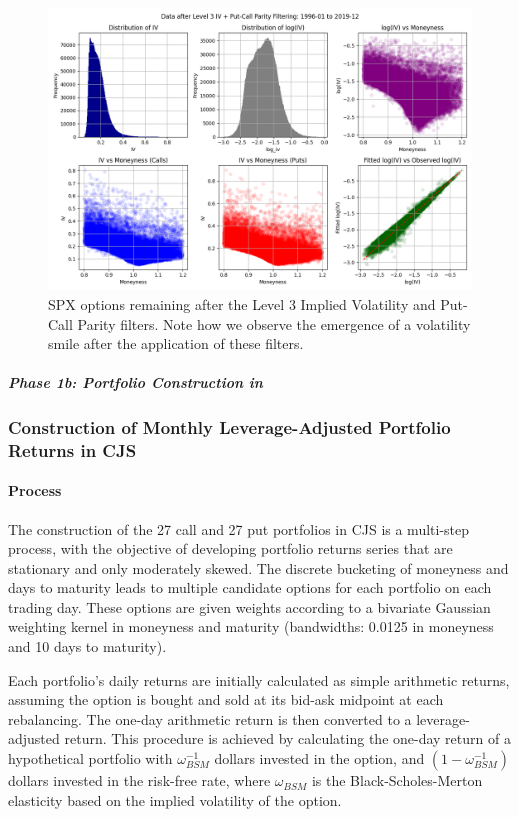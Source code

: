 \documentclass{article}
\begin{document}
\begin{appendices}
\begin{figure}[H]
  \centering
  \includegraphics[width=\linewidth,height=0.666\linewidth]{../docs_src/L3_IV_PCP_1996-01_2019-12_iv.png}
  \caption{SPX options remaining after the Level 3 Implied Volatility and Put-Call Parity filters. Note how we observe the emergence of a volatility smile after the application of these filters.}
  \label{fig:l3_iv_pcp_spx_options_data}
\end{figure}


\paragraph{\textit{Phase 1b: Portfolio Construction in \citet{Constantinides2013}}}
\subsubsection*{Construction of Monthly Leverage-Adjusted Portfolio Returns in CJS}

\paragraph{Process}
The construction of the 27 call and 27 put portfolios in CJS is a multi-step process, with the objective of developing portfolio returns series that are stationary and only moderately skewed. The discrete bucketing of moneyness and days to maturity leads to multiple candidate options for each portfolio on each trading day. These options are given weights according to a bivariate Gaussian weighting kernel in moneyness and maturity (bandwidths: 0.0125 in moneyness and 10 days to maturity).

Each portfolio's daily returns are initially calculated as simple arithmetic returns, assuming the option is bought and sold at its bid-ask midpoint at each rebalancing. The one-day arithmetic return is then converted to a leverage-adjusted return. This procedure is achieved by calculating the one-day return of a hypothetical portfolio with $\omega_{BSM}^{-1}$ dollars invested in the option, and $(1 - \omega_{BSM}^{-1})$ dollars invested in the risk-free rate, where $\omega_{BSM}$ is the Black-Scholes-Merton elasticity based on the implied volatility of the option.


\end{appendices}
\end{document}
